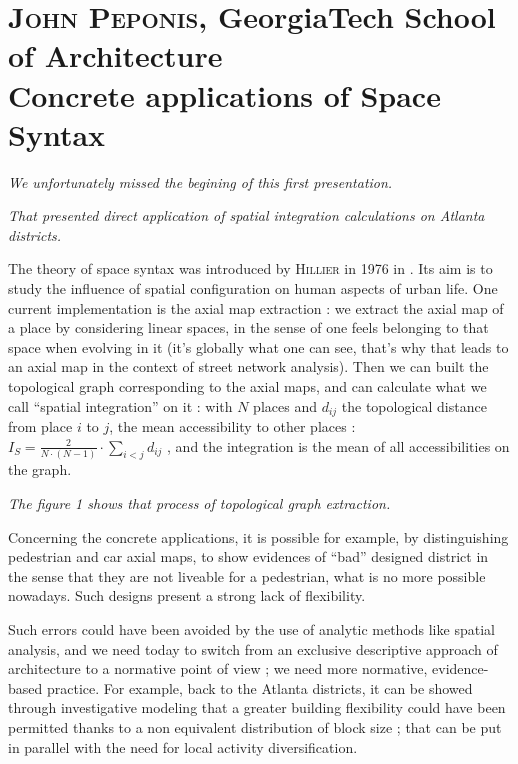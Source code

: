 \documentclass[english]{article}
\newcommand{\noun}[1]{\textsc{#1}}
\begin{document}
\newpage{}


\section*{\noun{John Peponis}, GeorgiaTech School of Architecture\protect \\
Concrete applications of Space Syntax}

\textit{We unfortunately missed the begining of this first presentation.}

\textit{That presented direct application of spatial integration calculations
on Atlanta districts.}

\bigskip{}


The theory of space syntax was introduced by \noun{Hillier} in 1976
in \cite{hillier1976space}. Its aim is to study the influence of
spatial configuration on human aspects of urban life. One current
implementation is the axial map extraction : we extract the axial
map of a place by considering linear spaces, in the sense of one feels
belonging to that space when evolving in it (it's globally what one
can see, that's why that leads to an axial map in the context of street
network analysis). Then we can built the topological graph corresponding
to the axial maps, and can calculate what we call ``spatial integration''
on it : with $N$ places and $d_{ij}$ the topological distance from
place $i$ to $j$, the mean accessibility to other places : $I_{S}=\frac{2}{N\cdot(N-1)}\cdot\sum_{i<j}d_{ij}$
, and the integration is the mean of all accessibilities on the graph.

\textit{The figure 1 shows that process of topological graph extraction.}

\bigskip{}


Concerning the concrete applications, it is possible for example,
by distinguishing pedestrian and car axial maps, to show evidences
of ``bad'' designed district in the sense that they are not liveable
for a pedestrian, what is no more possible nowadays. Such designs
present a strong lack of flexibility.

\bigskip{}


Such errors could have been avoided by the use of analytic methods
like spatial analysis, and we need today to switch from an exclusive
descriptive approach of architecture to a normative point of view
; we need more normative, evidence-based practice. For example, back
to the Atlanta districts, it can be showed through investigative modeling
that a greater building flexibility could have been permitted thanks
to a non equivalent distribution of block size ; that can be put in
parallel with the need for local activity diversification.
\end{document}

